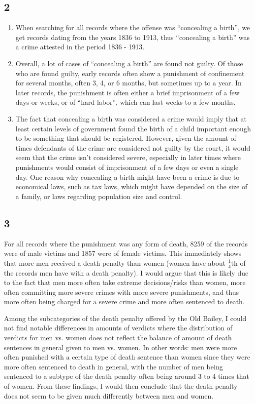 \documentclass{article}
\begin{document}
\subsection{2}
\begin{enumerate}
    \item When searching for all records where the offense was ``concealing a birth'', we get records dating from the years 1836 to 1913, thus ``concealing a birth'' was a crime attested in the period 1836 - 1913.
    \item Overall, a lot of cases of ``concealing a birth'' are found not guilty. Of those who are found guilty, early records often show a punishment of confinement for several months, often 3, 4, or 6 months, but sometimes up to a year. In later records, the punishment is often either a brief imprisonment of a few days or weeks, or of ``hard labor'', which can last weeks to a few months.
    \item The fact that concealing a birth was considered a crime would imply that at least certain levels of government found the birth of a child important enough to be something that should be registered. However, given the amount of times defendants of the crime are considered not guilty by the court, it would seem that the crime isn't considered severe, especially in later times where punishments would consist of imprisonment of a few days or even a single day. One reason why concealing a birth might have been a crime is due to economical laws, such as tax laws, which might have depended on the size of a family, or laws regarding population size and control.
\end{enumerate}

\subsection{3}
For all records where the punishment was any form of death, 8259 of the records were of male victims and 1857 were of female victims. This immediately shows that more men received a death penalty than women (women have about $\frac{1}{4}$th of the records men have with a death penalty). I would argue that this is likely due to the fact that men more often take extreme decisions/risks than women, more often committing more severe crimes with more severe punishments, and thus more often being charged for a severe crime and more often sentenced to death. 

Among the subcategories of the death penalty offered by the Old Bailey, I could not find notable differences in amounts of verdicts where the distribution of verdicts for men vs. women does not reflect the balance of amount of death sentences in general given to men vs. women. In other words: men were more often punished with a certain type of death sentence than women since they were more often sentenced to death in general, with the number of men being sentenced to a subtype of the death penalty often being around 3 to 4 times that of women. From these findings, I would then conclude that the death penalty does not seem to be given much differently between men and women.
\end{document}
